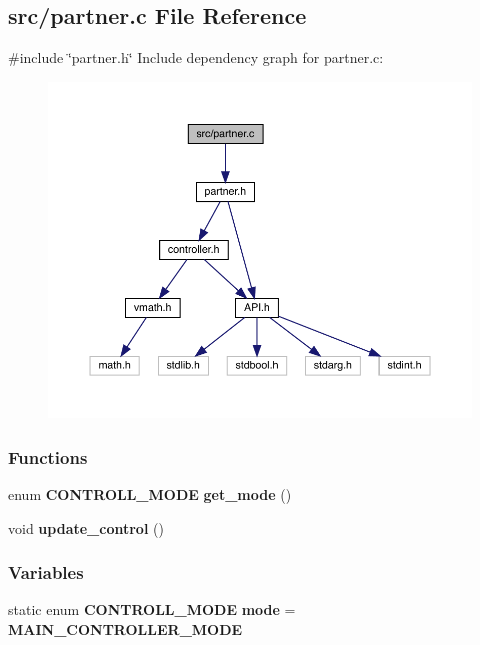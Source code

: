 \subsection{src/partner.c File Reference}
\label{partner_8c}
{\ttfamily \#include \char`\"{}partner.\+h\char`\"{}}\newline
Include dependency graph for partner.\+c\+:\nopagebreak
\begin{figure}[H]
\begin{center}
\leavevmode
\includegraphics[width=350pt]{partner_8c__incl}
\end{center}
\end{figure}
\subsubsection*{Functions}
\begin{DoxyCompactItemize}
\item 
enum \textbf{ C\+O\+N\+T\+R\+O\+L\+L\+\_\+\+M\+O\+DE} \textbf{ get\+\_\+mode} ()
\item 
void \textbf{ update\+\_\+control} ()
\end{DoxyCompactItemize}
\subsubsection*{Variables}
\begin{DoxyCompactItemize}
\item 
static enum \textbf{ C\+O\+N\+T\+R\+O\+L\+L\+\_\+\+M\+O\+DE} \textbf{ mode} = \textbf{ M\+A\+I\+N\+\_\+\+C\+O\+N\+T\+R\+O\+L\+L\+E\+R\+\_\+\+M\+O\+DE}
\end{DoxyCompactItemize}


